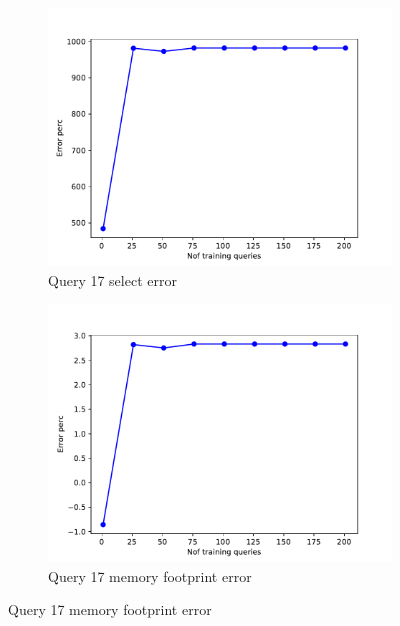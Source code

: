 \begin{figure}[!htb]
     \begin{subfigure}[t]{0.5\textwidth}
       \includegraphics[scale=0.4]{figs/tpch10/tpch10_sel17_error.pdf}
       \caption{Query 17 select error}
       \label{fig:tpch_sel17}
     \end{subfigure}
     \begin{subfigure}[t]{0.5\textwidth}
       \includegraphics[scale=0.4]{figs/tpch10/tpch10_q17_memerror.pdf}
       \caption{Query 17 memory footprint error}
       \label{fig:tpch_mem10}
     \end{subfigure}


\end{figure}
